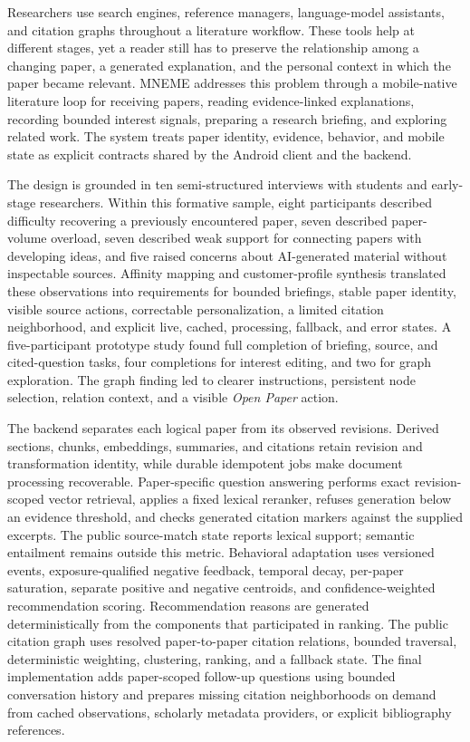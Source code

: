 
\begin{digest}

Researchers use search engines, reference managers, language-model assistants, and citation graphs throughout a literature workflow. These tools help at different stages, yet a reader still has to preserve the relationship among a changing paper, a generated explanation, and the personal context in which the paper became relevant. MNEME addresses this problem through a mobile-native literature loop for receiving papers, reading evidence-linked explanations, recording bounded interest signals, preparing a research briefing, and exploring related work. The system treats paper identity, evidence, behavior, and mobile state as explicit contracts shared by the Android client and the backend.

The design is grounded in ten semi-structured interviews with students and early-stage researchers. Within this formative sample, eight participants described difficulty recovering a previously encountered paper, seven described paper-volume overload, seven described weak support for connecting papers with developing ideas, and five raised concerns about AI-generated material without inspectable sources. Affinity mapping and customer-profile synthesis translated these observations into requirements for bounded briefings, stable paper identity, visible source actions, correctable personalization, a limited citation neighborhood, and explicit live, cached, processing, fallback, and error states. A five-participant prototype study found full completion of briefing, source, and cited-question tasks, four completions for interest editing, and two for graph exploration. The graph finding led to clearer instructions, persistent node selection, relation context, and a visible \emph{Open Paper} action.

The backend separates each logical paper from its observed revisions. Derived sections, chunks, embeddings, summaries, and citations retain revision and transformation identity, while durable idempotent jobs make document processing recoverable. Paper-specific question answering performs exact revision-scoped vector retrieval, applies a fixed lexical reranker, refuses generation below an evidence threshold, and checks generated citation markers against the supplied excerpts. The public source-match state reports lexical support; semantic entailment remains outside this metric. Behavioral adaptation uses versioned events, exposure-qualified negative feedback, temporal decay, per-paper saturation, separate positive and negative centroids, and confidence-weighted recommendation scoring. Recommendation reasons are generated deterministically from the components that participated in ranking. The public citation graph uses resolved paper-to-paper citation relations, bounded traversal, deterministic weighting, clustering, ranking, and a fallback state. The final implementation adds paper-scoped follow-up questions using bounded conversation history and prepares missing citation neighborhoods on demand from cached observations, scholarly metadata providers, or explicit bibliography references.


\end{digest}
